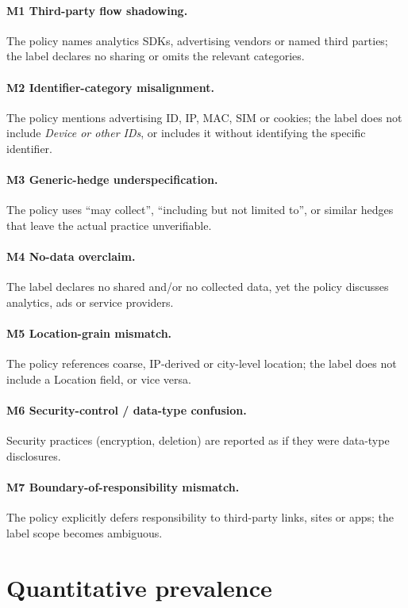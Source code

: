 \documentclass[11pt,a4paper]{article}
\begin{document}
\paragraph{M1 Third-party flow shadowing.} The policy names analytics
SDKs, advertising vendors or named third parties; the label declares no
sharing or omits the relevant categories.
\paragraph{M2 Identifier-category misalignment.} The policy mentions
advertising ID, IP, MAC, SIM or cookies; the label does not include
\emph{Device or other IDs}, or includes it without identifying the
specific identifier.
\paragraph{M3 Generic-hedge underspecification.} The policy uses
``may collect'', ``including but not limited to'', or similar hedges
that leave the actual practice unverifiable.
\paragraph{M4 No-data overclaim.} The label declares no shared and/or
no collected data, yet the policy discusses analytics, ads or service
providers.
\paragraph{M5 Location-grain mismatch.} The policy references coarse,
IP-derived or city-level location; the label does not include a Location
field, or vice versa.
\paragraph{M6 Security-control / data-type confusion.} Security
practices (encryption, deletion) are reported as if they were data-type
disclosures.
\paragraph{M7 Boundary-of-responsibility mismatch.} The policy explicitly
defers responsibility to third-party links, sites or apps; the label
scope becomes ambiguous.

\section{Quantitative prevalence}\label{sec:prev}
\end{document}
